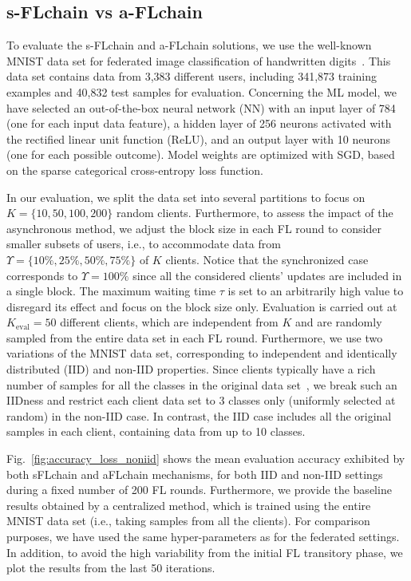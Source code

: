 \documentclass[10pt,journal,compsoc]{IEEEtran}
\begin{document}
\subsection{s-FLchain vs a-FLchain}
\label{section:flchain_analysis}

To evaluate the s-FLchain and a-FLchain solutions, we use the well-known MNIST data set for federated image classification of handwritten digits~\cite{lecun1998mnist}. This data set contains data from 3,383 different users, including 341,873 training examples and 40,832 test samples for evaluation. Concerning the ML model, we have selected an out-of-the-box neural network (NN) with an input layer of 784 (one for each input data feature), a hidden layer of 256 neurons activated with the rectified linear unit function (ReLU), and an output layer with 10 neurons (one for each possible outcome). Model weights are optimized with SGD, based on the sparse categorical cross-entropy loss function.

In our evaluation, we split the data set into several partitions to focus on $K=\{10, 50, 100, 200\}$ random clients. Furthermore, to assess the impact of the asynchronous method, we adjust the block size in each FL round to consider smaller subsets of users, i.e., to accommodate data from $\Upsilon = \{10\%, 25\%, 50\%, 75\%\}$ of $K$ clients. Notice that the synchronized case corresponds to $\Upsilon = 100\%$ since all the considered clients' updates are included in a single block. The maximum waiting time $\tau$ is set to an arbitrarily high value to disregard its effect and focus on the block size only. Evaluation is carried out at $K_\text{eval} = 50$ different clients, which are independent from $K$ and are randomly sampled from the entire data set in each FL round. Furthermore, we use two variations of the MNIST data set, corresponding to independent and identically distributed (IID) and non-IID properties. Since clients typically have a rich number of samples for all the classes in the original data set~\cite{lu2020blockchain}, we break such an IIDness and restrict each client data set to 3 classes only (uniformly selected at random) in the non-IID case. In contrast, the IID case includes all the original samples in each client, containing data from up to 10 classes.

Fig.~\ref{fig:accuracy_loss_noniid} shows the mean evaluation accuracy exhibited by both sFLchain and aFLchain mechanisms, for both IID and non-IID settings during a fixed number of 200 FL rounds. Furthermore, we provide the baseline results obtained by a centralized method, which is trained using the entire MNIST data set (i.e., taking samples from all the clients). For comparison purposes, we have used the same hyper-parameters as for the federated settings. In addition, to avoid the high variability from the initial FL transitory phase, we plot the results from the last 50 iterations. 
\end{document}
